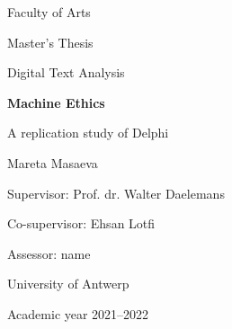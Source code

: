 \thispagestyle{plain}
    \begin{center}
    
        \vspace*{1cm}

        \large
        Faculty of Arts
        
        \vspace{0.5cm}
        Master’s Thesis 
        
        \vspace{0.5cm}
        Digital Text Analysis 
        
       \vspace{1.5cm}
            
        \Huge
        \textbf{Machine Ethics}
            
        \vspace{0.5cm}
        \LARGE
        A replication study of Delphi
            
        \vspace{1.5cm}
        
        \Large    
        Mareta Masaeva
        
        \vspace{0.5cm}
        
        \large
        Supervisor: Prof. dr. Walter Daelemans
        
        \vspace{0.5cm}
        Co-supervisor: Ehsan Lotfi
        
        \vspace{0.5cm}
        Assessor: name
        
        \vspace{1cm}
        University of Antwerp
        
        \vspace{1cm}   
        Academic year 2021–2022
            
    \end{center}